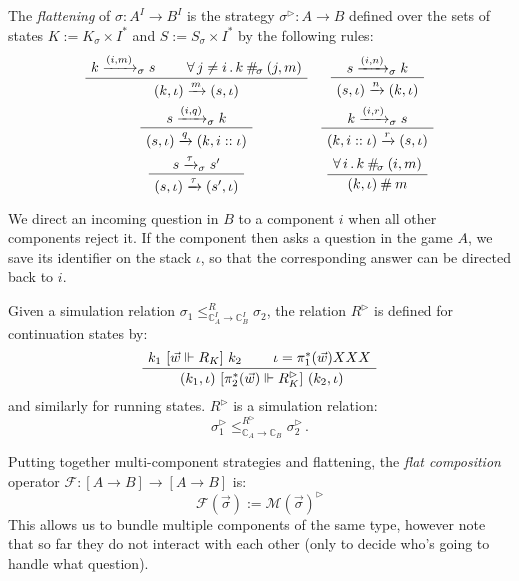 \begin{definition} %
The \emph{flattening} of $\sigma : A^I \rightarrow B^I$
is the strategy $\sigma^\rhd : A \rightarrow B$
defined over the sets of states
$K := K_\sigma \times I^*$ and
$S := S_\sigma \times I^*$ by the following rules:
\[
  \begin{array}{c@{\quad}c}
    \AxiomC{$k \xrightarrow{(i, m)}_\sigma s$}
    \AxiomC{$\forall \, j \ne i \,.\, k \: \#_{\!\sigma} \: (j, m)$}
    \BinaryInfC{$(k, \iota) \xrightarrow{m} (s, \iota)$}
    \DisplayProof
    &
    \AxiomC{$s \xrightarrow{(i, n)}_\sigma k$}
    \UnaryInfC{$(s, \iota) \xrightarrow{n} (k, \iota)$}
    \DisplayProof
    \\[1.5em]
    \AxiomC{$s \xrightarrow{(i, q)}_\sigma k$}
    \UnaryInfC{$(s, \iota) \xrightarrow{q} (k, i :: \iota)$}
    \DisplayProof
    &
    \AxiomC{$k \xrightarrow{(i, r)}_\sigma s$}
    \UnaryInfC{$(k, i :: \iota) \xrightarrow{r} (s, \iota)$}
    \DisplayProof
    \\[1.5em]
    \AxiomC{$s \xrightarrow{\tau}_\sigma s'$}
    \UnaryInfC{$(s, \iota) \xrightarrow{\tau} (s', \iota)$}
    \DisplayProof
    &
    \AxiomC{$\forall \,i\,.\, k \: \#_{\!\sigma} \: (i, m)$}
    \UnaryInfC{$(k, \iota) \:\#\: m$}
    \DisplayProof
  \end{array}
\]
\end{definition}

We direct an incoming question in $B$
to a component $i$ when all other components reject it.
If the component then asks a question in the game $A$,
we save its identifier on the stack $\iota$,
so that the corresponding answer can be directed back to $i$.

\begin{lemma}
Given a simulation relation
$\sigma_1 \le_{\mathbb{C}_A^I \rightarrow \mathbb{C}_B^I}^R \sigma_2$,
the relation $R^\rhd$ is defined for continuation states by:
\[
  \AxiomC{$k_1 \ifr{\vec{w} \Vdash R_K} k_2$}
  \AxiomC{$\iota = \pi_1^*(\vec{w}) \mbox{ XXX}$}
  \BinaryInfC{
    $(k_1, \iota) \ifr{\pi_2^*(\vec{w}) \Vdash R^\rhd_K} (k_2, \iota)$}
  \DisplayProof
\]
and similarly for running states.
$R^\rhd$ is a simulation relation:
\[
    \sigma_1^\rhd
    \le_{\mathbb{C}_A \rightarrow \mathbb{C}_B}^{R^\rhd}
    \sigma_2^\rhd \,.
\]
\end{lemma}

Putting together multi-component strategies and flattening,
the \emph{flat composition} operator
$\mathcal{F} : [A \rightarrow B] \rightarrow [A \rightarrow B]$
is:
\[
    \mathcal{F}(\vec{\sigma}) := \mathcal{M}(\vec{\sigma})^\rhd
\]
This allows us to bundle multiple components of the same type,
however note that so far they do not interact with each other
(only to decide who's going to handle what question).

